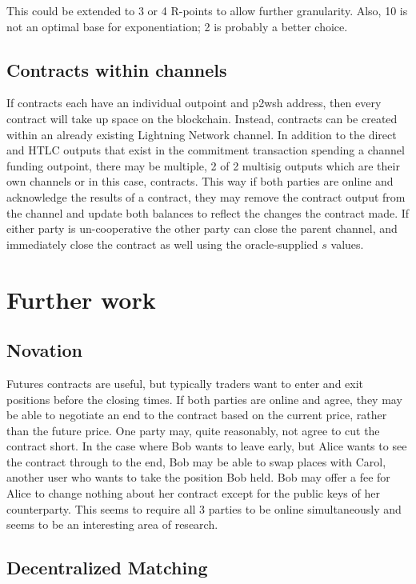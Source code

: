 \documentclass[11pt]{article}
\begin{document}
This could be extended to 3 or 4 R-points to allow further granularity.  Also, 10 is not an optimal base for exponentiation; 2 is probably a better choice.

\subsection*{Contracts within channels}

If contracts each have an individual outpoint and p2wsh address, then every contract will take up space on the blockchain.  Instead, contracts can be created within an already existing Lightning Network channel.  In addition to the direct and HTLC outputs that exist in the commitment transaction spending a channel funding outpoint, there may be multiple, 2 of 2 multisig outputs which are their own channels or in this case, contracts.  This way if both parties are online and acknowledge the results of a contract, they may remove the contract output from the channel and update both balances to reflect the changes the contract made.  If either party is un-cooperative the other party can close the parent channel, and immediately close the contract as well using the oracle-supplied \(s\) values.

\section*{Further work}

\subsection*{Novation}

Futures contracts are useful, but typically traders want to enter and exit positions before the closing times.   If both parties are online and agree, they may be able to negotiate an end to the contract based on the current price, rather than the future price.  One party may, quite reasonably, not agree to cut the contract short.  In the case where Bob wants to leave early, but Alice wants to see the contract through to the end, Bob may be able to swap places with Carol, another user who wants to take the position Bob held.  Bob may offer a fee for Alice to change nothing about her contract except for the public keys of her counterparty.  This seems to require all 3 parties to be online simultaneously and seems to be an interesting area of research.

\subsection*{Decentralized Matching}
\end{document}
